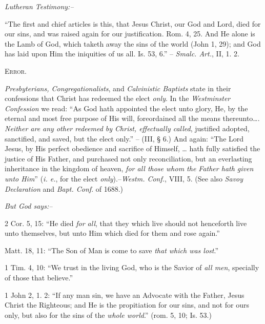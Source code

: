 \documentclass[
]{book}
\begin{document}
\begin{center}
\textsl{Lutheran Testimony:--}
\end{center}

``The first and chief articles is this, that Jesus Christ, our God and Lord, died for our sins, and was raised again for our justification. Rom. 4, 25. And He alone is the Lamb of God, which taketh away the sins of the world (John 1, 29); and God has laid upon Him the iniquities of us all. Is. 53, 6.'' -- \emph{Smalc. Art.}, II, 1. 2.

\begin{center}
\textsc{Error.}
\end{center}

\emph{Presbyterians, Congregationalists}, and \emph{Calvinistic Baptists} state in their confessions that Christ has redeemed the elect \emph{only}. In the \emph{Westminster Confession} we read: ``As God hath appointed the elect unto glory, He, by the eternal and most free purpose of His will, foreordained all the means thereunto\ldots. \emph{Neither are any other redeemed by Christ, effectually called}, justified adopted, sanctified, and saved, but the elect only.'' -- (III, § 6.) And again: ``The Lord Jesus, by His perfect obedience and sacrifice of Himself, \ldots{} hath fully satisfied the justice of His Father, and purchased not only reconciliation, but an everlasting inheritance in the kingdom of heaven, \emph{for all those whom the Father hath given unto Him}'' (\emph{i. e.}, for the elect \emph{only}).--\emph{Westm. Conf.}, VIII, 5. (See also \emph{Savoy Declaration} and \emph{Bapt. Conf}. of 1688.)

\begin{center}
\textsl{But God says:--}
\end{center}

2 Cor. 5, 15: ``He died \emph{for all}, that they which live should not henceforth live unto themselves, but unto Him which died for them and rose again.''

Matt. 18, 11: ``The Son of Man is come to save \emph{that which was lost}.''

1 Tim. 4, 10: ``We trust in the living God, who is the Savior of \emph{all men}, specially of those that believe.''

1 John 2, 1. 2: ``If any man sin, we have an Advocate with the Father, Jesus Christ the Righteous; and He is the propitiation for our sins, and not for ours only, but also for the sins of the \emph{whole world}.'' (rom. 5, 10; Is. 53.)
\end{document}
